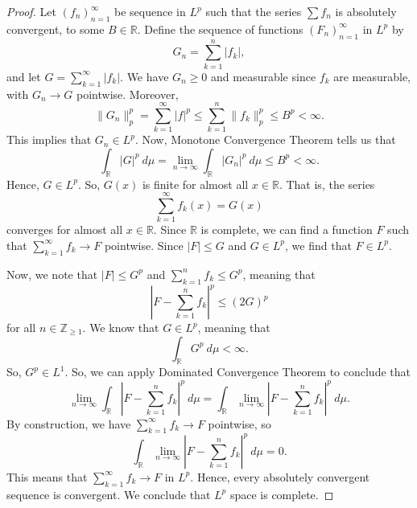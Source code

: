 \documentclass[a4paper, openany]{memoir}
\theoremstyle{definition}
\theoremstyle{plain}
\begin{document}
    \begin{proof}
        Let $(f_n)_{n=1}^\infty$ be sequence in $L^p$ such that the series $\sum f_n$ is absolutely convergent, to some $B \in \mathbb{R}$. Define the sequence of functions $(F_n)_{n=1}^\infty$ in $L^p$ by
        \[G_n = \sum_{k=1}^n |f_k|,\]
        and let $G = \sum_{k=1}^{\infty} |f_k|$. We have $G_n \geq 0$ and measurable since $f_k$ are measurable, with $G_n \to G$ pointwise. Moreover,
        \[\lVert G_n \rVert_p^p = \sum_{k=1}^\infty |f|^p \leq \sum_{k=1}^n \lVert f_k \rVert_p^p \leq B^p < \infty.\]
        This implies that $G_n \in L^p$. Now, Monotone Convergence Theorem tells us that 
        \[\int_{\mathbb{R}} |G|^p \ d\mu = \lim_{n \to \infty} \int_{\mathbb{R}} |G_n|^p \ d\mu \leq B^p < \infty.\]
        Hence, $G \in L^p$. So, $G(x)$ is finite for almost all $x \in \mathbb{R}$. That is, the series
        \[\sum_{k=1}^\infty f_k(x) = G(x)\]
        converges for almost all $x \in \mathbb{R}$. Since $\mathbb{R}$ is complete, we can find a function $F$ such that $\sum_{k=1}^\infty f_k \to F$ pointwise. Since $|F| \leq G$ and $G \in L^p$, we find that $F \in L^p$.

        Now, we note that $|F| \leq G^p$ and $\sum_{k=1}^{n} f_k \leq G^p$, meaning that
        \[\left|F - \sum_{k=1}^{n} f_k\right|^p \leq (2G)^p\]
        for all $n \in \mathbb{Z}_{\geq 1}$. We know that $G \in L^p$, meaning that
        \[\int_{\mathbb{R}} G^p \ d\mu < \infty.\]
        So, $G^p \in L^1$. So, we can apply Dominated Convergence Theorem to conclude that
        \[\lim_{n \to \infty} \int_{\mathbb{R}} \left|F - \sum_{k=1}^{n} f_k\right|^p \ d\mu = \int_{\mathbb{R}} \lim_{n \to \infty} \left|F - \sum_{k=1}^{n} f_k\right|^p \ d\mu.\]
        By construction, we have $\sum_{k=1}^\infty f_k \to F$ pointwise, so
        \[\int_{\mathbb{R}} \lim_{n \to \infty} \left|F - \sum_{k=1}^{n} f_k\right|^p \ d\mu = 0.\]
        This means that $\sum_{k=1}^\infty f_k \to F$ in $L^p$. Hence, every absolutely convergent sequence is convergent. We conclude that $L^p$ space is complete.
    \end{proof}
    
\end{document}
